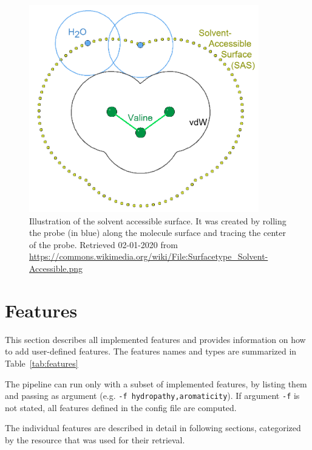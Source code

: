 \begin{figure}[!htbp]\centering
\includegraphics[width=100mm]{../img/sasa.png}
\caption{Illustration of the solvent accessible surface. It was created by rolling the probe (in blue) along the molecule surface and tracing the center of the probe. Retrieved 02-01-2020 from \url{https://commons.wikimedia.org/wiki/File:Surfacetype_Solvent-Accessible.png}}
\label{fig:sasa}
\end{figure}

\section{Features}

This section describes all implemented features and provides information on how to add user-defined features. The features names and types are summarized in Table~\ref{tab:features}

The pipeline can run only with a subset of implemented features, by listing them and passing as argument (e.g. \texttt{-f hydropathy,aromaticity}). If argument \texttt{-f} is not stated, all features defined in the config file are computed.

The individual features are described in detail in following sections, categorized by the resource that was used for their retrieval.

